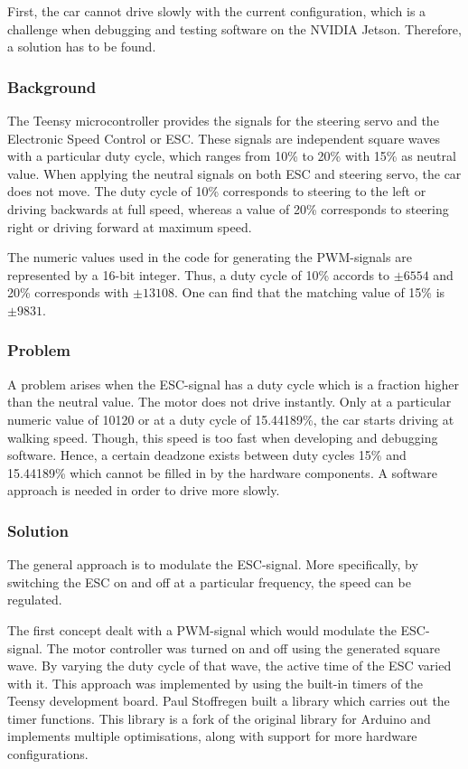 \documentclass[conference,a4paper]{IEEEtran}
\begin{document}

First, the car cannot drive slowly with the current configuration, which is a challenge when debugging and testing software on the NVIDIA Jetson. Therefore, a solution has to be found. 

\subsubsection{Background}The Teensy microcontroller provides the signals for the steering servo and the Electronic Speed Control or ESC. These signals are independent square waves with a particular duty cycle, which ranges from 10\% to 20\% with 15\% as neutral value. When applying the neutral signals on both ESC and steering servo, the car does not move. The duty cycle of 10\% corresponds to steering to the left or driving backwards at full speed, whereas a value of 20\% corresponds to steering right or driving forward at maximum speed.

The numeric values used in the code for generating the PWM-signals are represented by a 16-bit integer. Thus, a duty cycle of 10\% accords to $\pm 6554$ and 20\% corresponds with $\pm 13108$. One can find that the matching value of 15\% is $\pm 9831$.

\subsubsection{Problem}A problem arises when the ESC-signal has a duty cycle which is a fraction higher than the neutral value. The motor does not drive instantly. Only at a particular numeric value of 10120 or at a duty cycle of 15.44189\%, the car starts driving at walking speed. Though, this speed is too fast when developing and debugging software. Hence, a certain deadzone exists between duty cycles 15\% and 15.44189\% which cannot be filled in by the hardware components. A software approach is needed in order to drive more slowly.

\subsubsection{Solution} The general approach is to modulate the ESC-signal. More specifically, by switching the ESC on and off at a particular frequency, the speed can be regulated. 

The first concept dealt with a PWM-signal which would modulate the ESC-signal. The motor controller was turned on and off using the generated square wave. By varying the duty cycle of that wave, the active time of the ESC varied with it.
This approach was implemented by using the built-in timers of the Teensy development board.
Paul Stoffregen built a library which carries out the timer functions. This library is a fork of the original library for Arduino and implements multiple optimisations, along with support for more hardware configurations.
\end{document}
